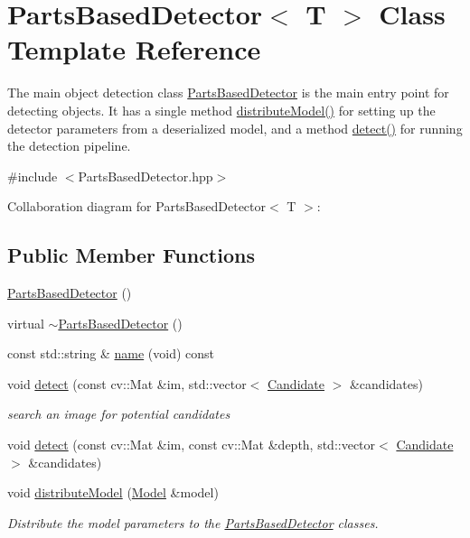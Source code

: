 \hypertarget{classPartsBasedDetector}{}\section{Parts\+Based\+Detector$<$ T $>$ Class Template Reference}
\label{classPartsBasedDetector}


The main object detection class \hyperlink{classPartsBasedDetector}{Parts\+Based\+Detector} is the main entry point for detecting objects. It has a single method \hyperlink{classPartsBasedDetector_a351a499cb2d7ab23d388a34c1c8f38a0}{distribute\+Model()} for setting up the detector parameters from a deserialized model, and a method \hyperlink{classPartsBasedDetector_a70c77effade6c39b06ddc0102973a1f8}{detect()} for running the detection pipeline.  




{\ttfamily \#include $<$Parts\+Based\+Detector.\+hpp$>$}



Collaboration diagram for Parts\+Based\+Detector$<$ T $>$\+:
\subsection*{Public Member Functions}
\begin{DoxyCompactItemize}
\item 
\hyperlink{classPartsBasedDetector_ac24d74d215b43fcc4101077f818e33a2}{Parts\+Based\+Detector} ()
\item 
virtual \hyperlink{classPartsBasedDetector_a3628d7bb534a709bb130027bbc61e257}{$\sim$\+Parts\+Based\+Detector} ()
\item 
const std\+::string \& \hyperlink{classPartsBasedDetector_aded2fe8d8b8b12f897d083123fe248a9}{name} (void) const 
\item 
void \hyperlink{classPartsBasedDetector_a70c77effade6c39b06ddc0102973a1f8}{detect} (const cv\+::\+Mat \&im, std\+::vector$<$ \hyperlink{classCandidate}{Candidate} $>$ \&candidates)
\begin{DoxyCompactList}\small\item\em search an image for potential candidates \end{DoxyCompactList}\item 
void \hyperlink{classPartsBasedDetector_ac286523b99f65a55a7e84fe9e2c2e662}{detect} (const cv\+::\+Mat \&im, const cv\+::\+Mat \&depth, std\+::vector$<$ \hyperlink{classCandidate}{Candidate} $>$ \&candidates)
\item 
void \hyperlink{classPartsBasedDetector_a351a499cb2d7ab23d388a34c1c8f38a0}{distribute\+Model} (\hyperlink{classModel}{Model} \&model)
\begin{DoxyCompactList}\small\item\em Distribute the model parameters to the \hyperlink{classPartsBasedDetector}{Parts\+Based\+Detector} classes. \end{DoxyCompactList}\end{DoxyCompactItemize}
